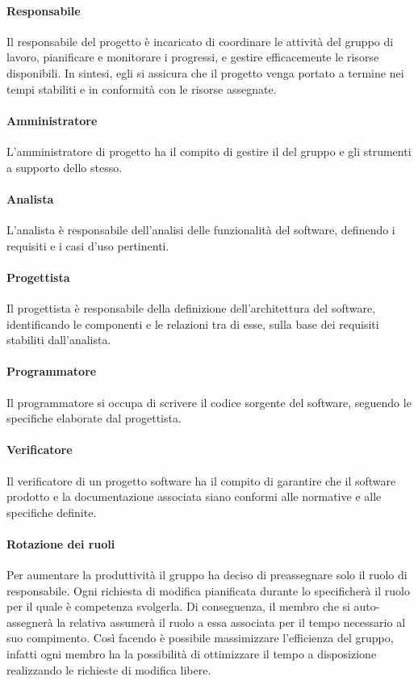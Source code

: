 \paragraph{Responsabile}
Il responsabile del progetto è incaricato di coordinare le attività del gruppo di lavoro, pianificare e monitorare i progressi, e gestire efficacemente le risorse disponibili. In sintesi, egli si assicura che il progetto venga portato a termine nei tempi stabiliti e in conformità con le risorse assegnate.


\paragraph{Amministratore}
L'amministratore di progetto ha il compito di gestire il  del gruppo e gli strumenti a supporto dello stesso.

\paragraph{Analista}
L'analista è responsabile dell’analisi delle funzionalità del software, definendo i requisiti e i casi d’uso pertinenti.

\paragraph{Progettista}
Il progettista è responsabile della definizione dell’architettura del software, identificando le componenti e le relazioni tra di esse, sulla base dei requisiti stabiliti dall’analista. 

\paragraph{Programmatore}
Il programmatore si occupa di scrivere il codice sorgente del software, seguendo le specifiche elaborate dal progettista.

\paragraph{Verificatore}
Il verificatore di un progetto software ha il compito di garantire che il software prodotto e la documentazione associata siano conformi alle normative e alle specifiche definite. 

\paragraph{Rotazione dei ruoli}
Per aumentare la produttività il gruppo ha deciso di preassegnare solo il ruolo di responsabile.
Ogni richiesta di modifica pianificata durante lo  specificherà il ruolo per il quale è competenza svolgerla.
Di conseguenza, il membro che si auto-assegnerà la relativa  assumerà il ruolo a essa associata per il tempo necessario al suo compimento.
Così facendo è possibile massimizzare l'efficienza del gruppo, infatti ogni membro ha la possibilità di ottimizzare il tempo a disposizione realizzando le richieste di modifica libere.


